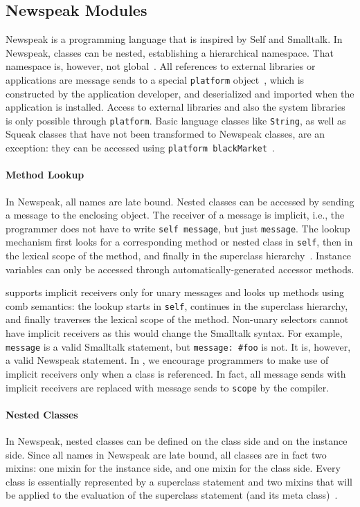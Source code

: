 \subsection{Newspeak Modules}
Newspeak is a programming language that is inspired by Self and Smalltalk. In Newspeak, classes can be nested, establishing a hierarchical namespace. That namespace is, however, not global~\cite{bracha2008newspeak, Bracha:2011:MDR:1960275.1960310}. All references to external libraries or applications are message sends to a special \texttt{platform} object~\cite{bracha:modules_as_objects}, which is constructed by the application developer, and deserialized and imported when the application is installed. Access to external libraries and also the system libraries is only possible through \texttt{platform}. Basic language classes like \texttt{String}, as well as Squeak classes that have not been transformed to Newspeak classes, are an exception: they can be accessed using \texttt{platform blackMarket}~\cite{newspeak101jan}.

\paragraph{Method Lookup}
In Newspeak, all names are late bound. Nested classes can be accessed by sending a message to the enclosing object. The receiver of a message is implicit, i.e., the programmer does not have to write \texttt{self message}, but just \texttt{message}. The lookup mechanism first looks for a corresponding method or nested class in \texttt{self}, then in the lexical scope of the method, and finally in the superclass hierarchy~\cite{bracha:modules_as_objects}. Instance variables can only be accessed through automatically-generated accessor methods.

\msname supports implicit receivers only for unary messages and looks up methods using comb semantics: the lookup starts in \texttt{self}, continues in the superclass hierarchy, and finally traverses the lexical scope of the method. Non-unary selectors cannot have implicit receivers as this would change the Smalltalk syntax. For example, \texttt{message} is a valid Smalltalk statement, but \texttt{message: \#foo} is not. It is, however, a valid Newspeak statement. In \msname, we encourage programmers to make use of implicit receivers only when a class is referenced. In fact, all message sends with implicit receivers are replaced with message sends to \texttt{scope} by the compiler.

\paragraph{Nested Classes}
In Newspeak, nested classes can be defined on the class side and on the instance side. Since all names in Newspeak are late bound, all classes are in fact two mixins: one mixin for the instance side, and one mixin for the class side. Every class is essentially represented by a superclass statement and two mixins that will be applied to the evaluation of the superclass statement (and its meta class)~\cite{Bracha09newspeakprogramming}.

